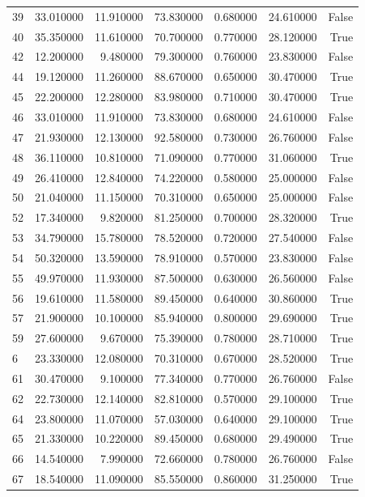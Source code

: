 \begin{table}
\begin{tabular}{lrrrrrr}
39 & 33.010000 & 11.910000 & 73.830000 & 0.680000 & 24.610000 & False \\
40 & 35.350000 & 11.610000 & 70.700000 & 0.770000 & 28.120000 & True \\
42 & 12.200000 & 9.480000 & 79.300000 & 0.760000 & 23.830000 & False \\
44 & 19.120000 & 11.260000 & 88.670000 & 0.650000 & 30.470000 & True \\
45 & 22.200000 & 12.280000 & 83.980000 & 0.710000 & 30.470000 & True \\
46 & 33.010000 & 11.910000 & 73.830000 & 0.680000 & 24.610000 & False \\
47 & 21.930000 & 12.130000 & 92.580000 & 0.730000 & 26.760000 & False \\
48 & 36.110000 & 10.810000 & 71.090000 & 0.770000 & 31.060000 & True \\
49 & 26.410000 & 12.840000 & 74.220000 & 0.580000 & 25.000000 & False \\
50 & 21.040000 & 11.150000 & 70.310000 & 0.650000 & 25.000000 & False \\
52 & 17.340000 & 9.820000 & 81.250000 & 0.700000 & 28.320000 & True \\
53 & 34.790000 & 15.780000 & 78.520000 & 0.720000 & 27.540000 & False \\
54 & 50.320000 & 13.590000 & 78.910000 & 0.570000 & 23.830000 & False \\
55 & 49.970000 & 11.930000 & 87.500000 & 0.630000 & 26.560000 & False \\
56 & 19.610000 & 11.580000 & 89.450000 & 0.640000 & 30.860000 & True \\
57 & 21.900000 & 10.100000 & 85.940000 & 0.800000 & 29.690000 & True \\
59 & 27.600000 & 9.670000 & 75.390000 & 0.780000 & 28.710000 & True \\
6 & 23.330000 & 12.080000 & 70.310000 & 0.670000 & 28.520000 & True \\
61 & 30.470000 & 9.100000 & 77.340000 & 0.770000 & 26.760000 & False \\
62 & 22.730000 & 12.140000 & 82.810000 & 0.570000 & 29.100000 & True \\
64 & 23.800000 & 11.070000 & 57.030000 & 0.640000 & 29.100000 & True \\
65 & 21.330000 & 10.220000 & 89.450000 & 0.680000 & 29.490000 & True \\
66 & 14.540000 & 7.990000 & 72.660000 & 0.780000 & 26.760000 & False \\
67 & 18.540000 & 11.090000 & 85.550000 & 0.860000 & 31.250000 & True \\

\end{tabular}
\end{table}
